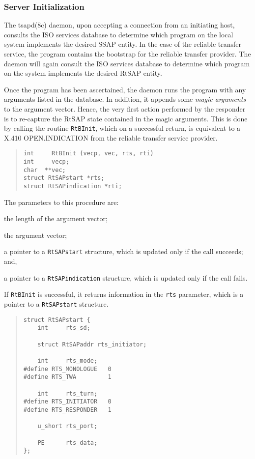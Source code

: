 \subsubsection     {Server Initialization}
The \man tsapd(8c) daemon,
upon accepting a connection from an initiating host,
consults the ISO services database to determine which program
on the local system implements the desired SSAP entity.
In the case of the reliable transfer service,
the  program contains the bootstrap for the reliable transfer
provider.
The daemon will again consult the ISO services database to determine which
program on the system implements the desired RtSAP entity.

Once the program has been ascertained,
the daemon runs the program with any arguments listed in the database.
In addition,
it appends some {\em magic arguments\/} to the argument vector.
Hence,
the very first action performed by the responder is to re-capture the RtSAP
state contained in the magic arguments.
This is done by calling the routine \verb"RtBInit",
which on a successful return,
is equivalent to a {\sf X.410 OPEN.INDICATION\/} from the reliable transfer
service provider.
\begin{quote}\small\begin{verbatim}
int     RtBInit (vecp, vec, rts, rti)
int     vecp;
char  **vec;
struct RtSAPstart *rts;
struct RtSAPindication *rti;
\end{verbatim}\end{quote}
The parameters to this procedure are:
\begin{describe}
\item[\verb"vecp":] the length of the argument vector;

\item[\verb"vec":] the argument vector;

\item[\verb"rts":] a pointer to a \verb"RtSAPstart" structure, which is
updated only if the call succeeds;
and,

\item[\verb"rti":] a pointer to a \verb"RtSAPindication" structure, which is
updated only if the call fails.
\end{describe}
If \verb"RtBInit" is successful,
it returns information in the \verb"rts" parameter,
which is a pointer to a \verb"RtSAPstart" structure.
\begin{quote}\small\begin{verbatim}
struct RtSAPstart {
    int     rts_sd;

    struct RtSAPaddr rts_initiator;

    int     rts_mode;
#define RTS_MONOLOGUE   0
#define RTS_TWA         1

    int     rts_turn;
#define RTS_INITIATOR   0
#define RTS_RESPONDER   1

    u_short rts_port;

    PE      rts_data;
};
\end{verbatim}\end{quote}
